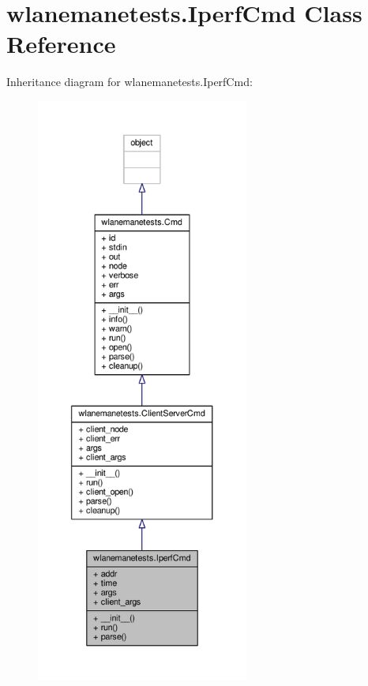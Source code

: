 \hypertarget{classwlanemanetests_1_1_iperf_cmd}{\section{wlanemanetests.\+Iperf\+Cmd Class Reference}
\label{classwlanemanetests_1_1_iperf_cmd}
}


Inheritance diagram for wlanemanetests.\+Iperf\+Cmd\+:
\nopagebreak
\begin{figure}[H]
\begin{center}
\leavevmode
\includegraphics[height=550pt]{classwlanemanetests_1_1_iperf_cmd__inherit__graph}
\end{center}
\end{figure}


